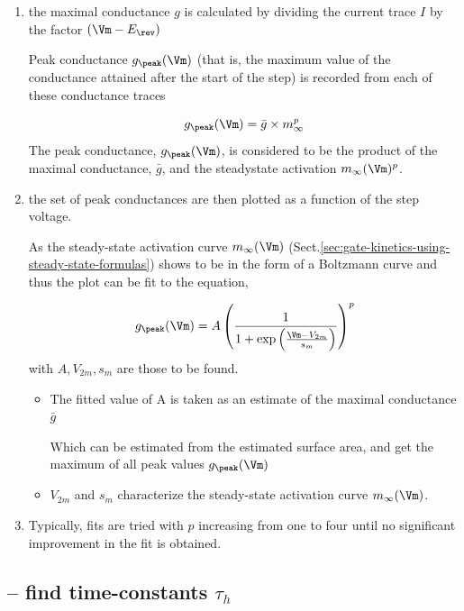 \begin{enumerate}
  \item the maximal conductance $g$ is calculated by dividing the current trace
  $I$ by the factor $(\Vm - E_\rev)$

Peak conductance $g_\peak(\Vm)$ (that is, the maximum value of the conductance
attained after the start of the step) is recorded from each of these conductance
traces

\begin{equation}
g_\peak(\Vm) = \bar{g} \times m_\infty^p
\end{equation}
The peak conductance, $g_\peak(\Vm)$, is considered to be the
product of the maximal conductance, $\bar{g}$, and the steadystate
activation $m_\infty(\Vm)^p$.

  \item  the set of peak conductances are then plotted as a function of the step
  voltage.

As the steady-state activation curve $m_\infty(\Vm)$
(Sect.\ref{sec:gate-kinetics-using-steady-state-formulas}) shows to be in the
form of a Boltzmann curve and thus the plot can be fit to the equation,

\begin{equation}
g_\peak(\Vm) = A \left( \frac{1}{1 + \exp\left(  \frac{\Vm - V_{2m}}{s_m}
\right)} \right)^p
\end{equation}
with $A, V_{2m}, s_m$ are those to be found.

\begin{itemize}
  \item  The fitted value of A is taken as an estimate of the maximal
  conductance  $\bar{g}$

Which can be estimated from the estimated surface area, and get the maximum of
all peak values $g_\peak(\Vm)$

  \item $V_{2m}$ and $s_m$ characterize the steady-state activation curve
  $m_\infty(\Vm)$.

\end{itemize}

  \item Typically, fits are tried with $p$ increasing from one to four until no
  significant improvement in the fit is obtained.
\end{enumerate}


\subsection[-- find time-constants tau-h]{-- find time-constants
$\tau_h$}

